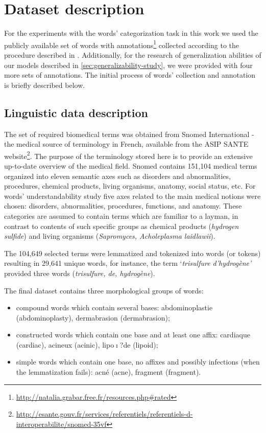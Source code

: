 \chapter{Dataset description}
\label{ch:dataset-description}

For the experiments with the words' categorization task in this work we used the publicly available set of words with annotations\footnote{\url{http://natalia.grabar.free.fr/resources.php#rated}} collected according to the procedure described in \cite{Grabar-PITR2014}. Additionally, for the research of generalization abilities of our models described in \ref{sec:generalizability-study}, we were provided with four more sets of annotations.
The initial process of words' collection and annotation is briefly described below.

\section{Linguistic data description}
\label{sec:linguistic-data-description}

The set of required biomedical terms was obtained from Snomed International \citep{Cote-93} - the medical source of terminology in French, available from the ASIP SANTE website\footnote{\url{http://esante.gouv.fr/services/referentiels/referentiels-d-interoperabilite/snomed-35vf}}. The purpose of the terminology stored here is to provide an extensive up-to-date overview of the medical field. Snomed contains 151,104 medical terms organized into eleven semantic axes such as disorders and abnormalities, procedures, chemical products, living organisms, anatomy, social status, etc. For words' understandability study five axes related to the main medical notions were chosen: disorders, abnormalities, procedures, functions, and anatomy. These categories are assumed to contain terms which are familiar to a layman, in contrast to contents of such specific groups as chemical products (\textit{hydrogen sulfide}) and living organisms (\textit{Sapromyces, Acholeplasma laidlawii}).

The 104,649 selected terms were lemmatized and tokenized into words (or tokens) resulting in 29,641 unique words, for instance, the term `\textit{trisulfure d'hydrog\`{e}ne'} provided three words (\textit{trisulfure, de, hydrog\`{e}ne}).

The final dataset contains three morphological groups of words:
\begin{itemize}
    \item  compound words which contain several bases: abdominoplastie (abdominoplasty), dermabrasion (dermabrasion);
    \item  constructed words which contain one base and at least one affix: cardiaque (cardiac), acineux (acinic), lipo$\mathrm{\imath}$?de (lipoid);
    \item  simple words which contain one base, no affixes and possibly infections (when the lemmatization fails): acn\'{e} (acne), fragment (fragment).
\end{itemize}

